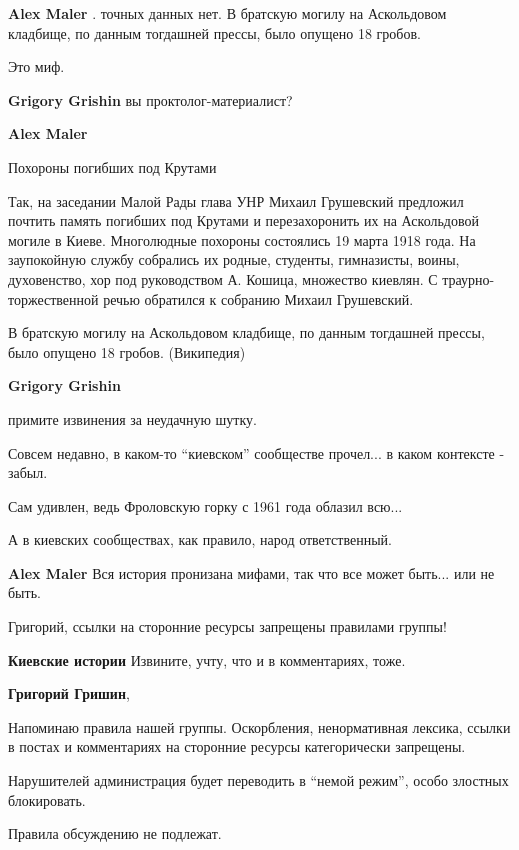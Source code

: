 \begin{itemize}
\begin{itemize}
\textbf{Alex Maler} . точных данных нет. В братскую могилу на Аскольдовом
кладбище, по данным тогдашней прессы, было опущено 18 гробов.


Это миф.

\textbf{Grigory Grishin} вы проктолог-материалист?

\textbf{Alex Maler} 

Похороны погибших под Крутами

Так, на заседании Малой Рады глава УНР Михаил Грушевский предложил почтить
память погибших под Крутами и перезахоронить их на Аскольдовой могиле в Киеве.
Многолюдные похороны состоялись 19 марта 1918 года. На заупокойную службу
собрались их родные, студенты, гимназисты, воины, духовенство, хор под
руководством А. Кошица, множество киевлян. С траурно-торжественной речью
обратился к собранию Михаил Грушевский.

В братскую могилу на Аскольдовом кладбище, по данным тогдашней прессы, было
опущено 18 гробов. (Википедия)

\textbf{Grigory Grishin} 

примите извинения за неудачную шутку.

Совсем недавно, в каком-то \enquote{киевском} сообществе прочел... в каком контексте - забыл.

Сам удивлен, ведь Фроловскую горку с 1961 года облазил всю...

А в киевских сообществах, как правило, народ ответственный.

\begin{itemize} %
\textbf{Alex Maler} Вся история пронизана мифами, так что все может быть... или не быть.

Григорий, ссылки на сторонние ресурсы запрещены правилами группы!

\textbf{Киевские истории} Извините, учту, что и в комментариях, тоже.

\textbf{Григорий Гришин}, 

Напоминаю правила нашей группы. Оскорбления, ненормативная лексика, ссылки в
постах и комментариях на сторонние ресурсы категорически запрещены.

Нарушителей администрация будет переводить в \enquote{немой режим}, особо злостных
блокировать.

Правила обсуждению не подлежат.


\end{itemize}
\end{itemize}
\end{itemize}
